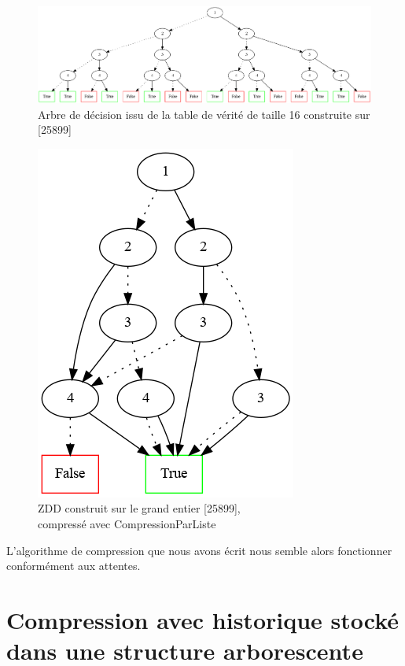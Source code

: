 \documentclass[12pt,a4paper]{article}
\begin{document}
\begin{figure}[hbtp]
\centering
\includegraphics[scale=0.3]{../Images/arbre_non_compresse.png} 
\caption{Arbre de décision issu de la table de vérité de taille 16 construite sur [25899]}
\label{fig1}
\end{figure}


\newpage
\begin{figure}[hbtp]
\centering
\includegraphics[scale=0.5]{../Images/arbre_compresse_par_liste.png}
\caption{ZDD construit sur le grand entier [25899],\\ compressé avec CompressionParListe}
\label{fig2}
\end{figure}

L'algorithme de compression que nous avons écrit nous semble alors fonctionner conformément aux attentes.

\section{Compression avec historique stocké dans une structure arborescente}
\end{document}
